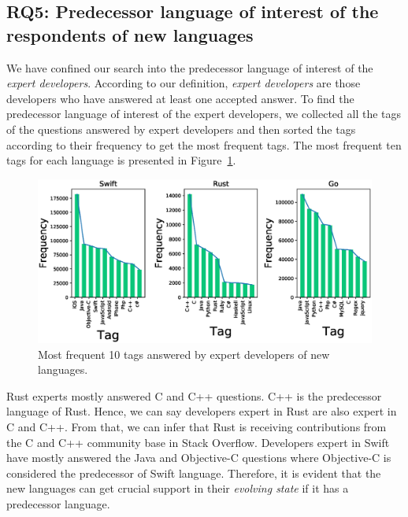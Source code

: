\subsection{RQ5: Predecessor language of interest of the respondents of new languages}
\label{RQ5}
We have confined our search into the predecessor language of interest of the \emph{expert developers}. According to our definition,  \emph{expert developers} are those developers who have answered at least one accepted answer.
To find the predecessor language of interest of the expert developers, we collected all the tags of the questions answered by expert developers and then sorted the tags according to their frequency to get the most frequent tags. The most frequent ten tags for each language is presented in Figure~\ref{fig:dev skills}.
% 
\begin{figure}[t!]
\centering
\includegraphics[scale=0.35]{figures/Tagfrequency.eps}
\caption{Most frequent 10 tags answered by expert developers of new languages.}
\label{fig:dev skills}
\end{figure}

Rust experts mostly answered  C and C++ questions. C++ is the predecessor language of Rust. Hence, we can say developers expert in Rust are also expert in C and C++. From that, we can infer that Rust is receiving contributions from the C and C++ community base in Stack Overflow. Developers expert in Swift have mostly answered the Java and Objective-C questions where Objective-C is considered the predecessor of Swift language. Therefore, it is evident that the new languages can get crucial support in their \emph{evolving state} if it has a predecessor language.


